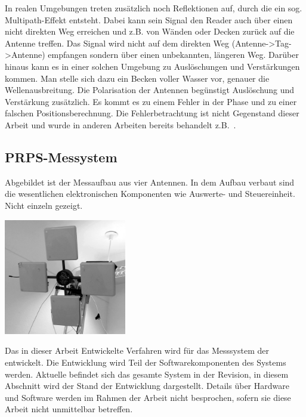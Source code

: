 In realen Umgebungen treten zusätzlich noch Reflektionen auf, durch die ein sog. Multipath-Effekt entsteht. Dabei kann sein Signal den Reader auch über einen nicht direkten Weg erreichen und z.B. von Wänden oder Decken zurück auf die Antenne treffen. Das Signal wird nicht auf dem direkten Weg (Antenne->Tag->Antenne) empfangen sondern über einen unbekannten, längeren Weg. Darüber hinaus kann es in einer solchen Umgebung zu Auslöschungen und Verstärkungen kommen. Man stelle sich dazu ein Becken voller Wasser vor, genauer die Wellenausbreitung. Die Polarisation der Antennen begünstigt Auslöschung und Verstärkung zusätzlich. Es kommt es zu einem Fehler in der Phase und zu einer falschen Positionsberechnung. Die Fehlerbetrachtung ist nicht Gegenstand dieser Arbeit und wurde in anderen Arbeiten bereits behandelt z.B.~\cite{Borgwerth1}.
%

\subsection{PRPS-Messystem}
%
\begin{floatingfigure}[hr!]{7cm}
         \centering
         \caption[PRPS der \amedogmbh]{Abgebildet ist der Messaufbau aus vier Antennen. In dem Aufbau verbaut sind die wesentlichen elektronischen Komponenten wie Auswerte- und Steuereinheit. Nicht einzeln gezeigt.}
         \vspace{2mm}
         \label{fig:System}
         \includegraphics[width=0.4\textwidth]{img/4AntennaSetup_small.png}
         \vspace{2mm}
%         
\end{floatingfigure}
%
Das in dieser Arbeit Entwickelte Verfahren wird für das Messsystem der \amedogmbh entwickelt. Die Entwicklung wird Teil der Softwarekomponenten des Systems werden. Aktuelle befindet sich das gesamte System in der Revision, in diesem Abschnitt wird der Stand der Entwicklung dargestellt. Details über Hardware und Software werden im Rahmen der Arbeit nicht besprochen, sofern sie diese Arbeit nicht unmittelbar betreffen. \\
%

